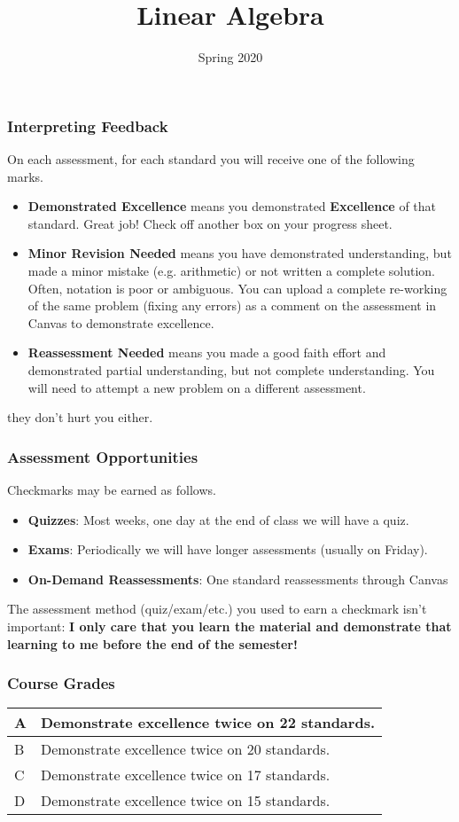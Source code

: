 \documentclass[aspectration=1610]{beamer}
\title{Linear Algebra}
\date{Spring 2020}
\begin{document}
\begin{frame}\frametitle{Interpreting Feedback}
On each assessment, for each standard you will receive one of the following marks.
\begin{itemize}
\item {\bf Demonstrated Excellence} means you demonstrated \textbf{Excellence} of that standard.
      Great job!  Check off another box on your progress sheet.
\item {\bf Minor Revision Needed} means you have demonstrated understanding, but made a minor mistake (e.g. arithmetic) or not written a complete solution.  Often, notation is poor or ambiguous.  You can upload a complete re-working of the same problem (fixing any errors) as a comment on the assessment in Canvas to demonstrate excellence.
\item {\bf Reassessment Needed} means you made a good faith effort and demonstrated
      partial understanding, but not complete understanding. You will need to attempt a new problem on a different assessment. 
\end{itemize}

\vspace{0.2in}

they don't hurt you either.
\end{frame}

\begin{frame}\frametitle{Assessment Opportunities}
Checkmarks may be earned as follows.
\begin{itemize}
\item {\bf Quizzes}: Most weeks, one day at the end of class we will have a quiz. 
\item {\bf Exams}: Periodically we will have longer assessments (usually on Friday).
\item {\bf On-Demand Reassessments}: One standard reassessments through Canvas
\end{itemize}

\pause

\vspace{0.2in}

The assessment method (quiz/exam/etc.) you used to earn a checkmark
isn't important: \textbf{I only care that you
learn the material and demonstrate that learning to me before the end of the
semester!}
\end{frame}




\begin{frame}\frametitle{Course Grades}

\begin{center}
\begin{tabular}{ll} \hline
A & Demonstrate excellence twice on 22 standards.\\ \hline
B &  Demonstrate excellence twice on 20 standards. \\ \hline
C &  Demonstrate excellence twice on 17 standards. \\ \hline
D &   Demonstrate excellence twice on 15 standards. \\ \hline
\end{tabular}
\end{center}

\end{frame}
\end{document}
